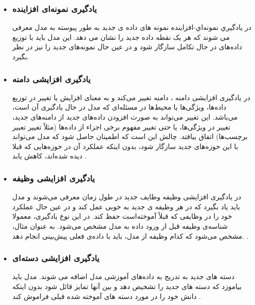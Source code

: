 \begin{itemize}
	\item \subsubsection{یادگیری نمونه‌ای افزاینده}
در یادگیري نمونه‌اي-افزاینده 
نمونه های داده ی جدید به طور پیوسته به مدل معرفی می شوند که هر یک نقطه داده جدید را نشان می دهد. این مدل باید با توزیع داده‌های در حال تکامل سازگار شود و در عین حال نمونه‌های جدید را نیز در نظر بگیرد.
	\item \subsubsection{یادگیری افزایشی دامنه}
 در یادگیری افزایشی دامنه
 ، دامنه تغییر می‌کند و به معنای افزایش یا تغییر در توزیع داده‌ها، ویژگی‌ها یا محیط‌ها در مسئله‌ای که مدل در حال یادگیری آن است، می‌باشد. این تغییر می‌تواند به صورت افزودن داده‌های جدید از دامنه‌های جدید، تغییر در ویژگی‌ها، یا حتی تغییر مفهوم برخی اجزاء از داده‌ها (مثلاً تغییر تعبیر برچسب‌ها) اتفاق بیافتد. چالش این است که اطمینان حاصل شود که مدل می‌تواند با این حوزه‌های جدید سازگار شود، بدون اینکه عملکرد آن در حوزه‌هایی که قبلا دیده شده‌اند، کاهش یابد
\cite{2,3,4}.
	\item \subsubsection{یادگیری افزایشی وظیفه}
در یادگیری افزایشی وظیفه  
وظایف جدید در طول زمان معرفی می‌شوند و مدل باید یاد بگیرد که در هر وظیفه ی جدید به خوبی عمل کند و در عین حال عملکرد خود را در وظایفی که قبلاً آموخته‌است حفظ کند. در این نوع یادگیری، معمولا شناسه‌ی وظیفه 
قبل از ورود داده به مدل مشخص می‌شود. به عنوان مثال، مشخص می‌شود که کدام وظیفه از مدل، باید با داده‌ی فعلی پیش‌بینی انجام دهد.
\cite{3}.
	\item \subsubsection{یادگیری افزایشی دسته‌ای}
دسته های جدید به تدریج به داده‌های آموزشی مدل اضافه می شوند. مدل باید بیاموزد که دسته های جدید را تشخیص دهد و بین آنها تمایز قائل شود بدون اینکه دانش خود را در مورد دسته های آموخته شده قبلی فراموش کند
\cite{2,3,5,6}.

\end{itemize}

